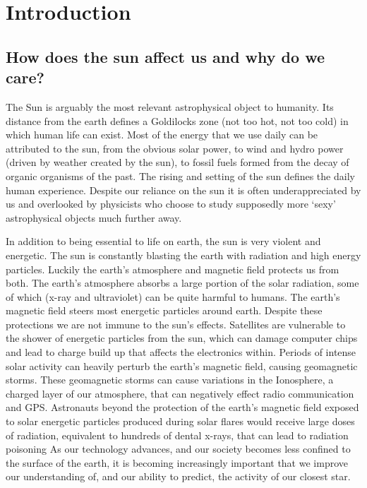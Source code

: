 \chapter{Introduction}\label{CH:introduction}


\section{How does the sun affect us and why do we care?}
The Sun is arguably the most relevant astrophysical object to humanity.
Its distance from the earth defines a Goldilocks zone (not too hot, not too cold) in which human life can exist.
Most of the energy that we use daily can be attributed to the sun, from the obvious solar power, to wind and hydro power (driven by weather created by the sun), to fossil fuels formed from the decay of organic organisms of the past.
The rising and setting of the sun defines the daily human experience.
Despite our reliance on the sun it is often underappreciated by us and overlooked by physicists who choose to study supposedly more `sexy' astrophysical objects much further away.

In addition to being essential to life on earth, the sun is very violent and energetic.
The sun is constantly blasting the earth with radiation and high energy particles.
Luckily the earth's atmosphere and magnetic field protects us from both.
The earth's atmosphere absorbs a large portion of the solar radiation, some of which (x-ray and ultraviolet) can be quite harmful to humans.
The earth's magnetic field steers most energetic particles around earth.
Despite these protections we are not immune to the sun's effects.
Satellites are vulnerable to the shower of energetic particles from the sun, which can damage computer chips and lead to charge build up that affects the electronics within.
Periods of intense solar activity can heavily perturb the earth's magnetic field, causing geomagnetic storms.
These geomagnetic storms can cause variations in the Ionosphere, a charged layer of our atmosphere, that can negatively effect radio communication and GPS.
Astronauts beyond the protection of the earth's magnetic field exposed to solar energetic particles produced during solar flares would receive large doses of radiation, equivalent to hundreds of dental x-rays, that can lead to radiation poisoning \citep[][and references therein]{Temmer2021}
As our technology advances, and our society becomes less confined to the surface of the earth, it is becoming increasingly important that we improve our understanding of, and our ability to predict, the activity of our closest star.

